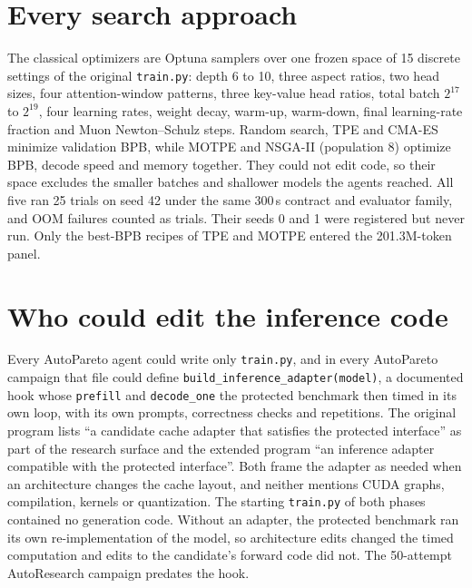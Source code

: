 \documentclass{article}
\begin{document}
\section{Every search approach}\label{app:approaches}
\begin{table}[H]
\caption{Every search approach and what became of its recipes. Attempts: scheduled (completed and trained). Best val BPB: the lowest validation BPB of one archived 300\,s discovery run, per seed for AutoPareto (0 / 1 / 42) and for AutoResearch's 50-attempt campaign / 5-attempt follow-up. These are single noisy runs (pooled seed SD \CRPooledSD), comparable only within one seed and phase: the starting model's score differs by \CRBaseSeedEffect{} BPB between seeds 0 and 42, and the extended harness is another setting. Verified: retrained on new seeds in the seeds 3 to 5 panel (Table~\ref{tab:benchseeds}), E1, the Opus retraining or the 13-recipe test (Table~\ref{tab:verify}), or re-measured on a fresh A40.}\label{tab:approaches}
\centering\scriptsize\setlength{\tabcolsep}{3pt}
\end{table}
The classical optimizers are Optuna samplers over one frozen space of 15 discrete settings of the original \texttt{train.py}: depth 6 to 10, three aspect ratios, two head sizes, four attention-window patterns, three key-value head ratios, total batch $2^{17}$ to $2^{19}$, four learning rates, weight decay, warm-up, warm-down, final learning-rate fraction and Muon Newton--Schulz steps. Random search, TPE and CMA-ES minimize validation BPB, while MOTPE and NSGA-II (population 8) optimize BPB, decode speed and memory together. They could not edit code, so their space excludes the smaller batches and shallower models the agents reached. All five ran 25 trials on seed 42 under the same 300\,s contract and evaluator family, and OOM failures counted as trials. Their seeds 0 and 1 were registered but never run. Only the best-BPB recipes of TPE and MOTPE entered the 201.3M-token panel.

\section{Who could edit the inference code}\label{app:access}
Every AutoPareto agent could write only \texttt{train.py}, and in every AutoPareto campaign that file could define \texttt{build\_inference\_adapter(model)}, a documented hook whose \texttt{prefill} and \texttt{decode\_one} the protected benchmark then timed in its own loop, with its own prompts, correctness checks and repetitions. The original program lists ``a candidate cache adapter that satisfies the protected interface'' as part of the research surface and the extended program ``an inference adapter compatible with the protected interface''. Both frame the adapter as needed when an architecture changes the cache layout, and neither mentions CUDA graphs, compilation, kernels or quantization. The starting \texttt{train.py} of both phases contained no generation code. Without an adapter, the protected benchmark ran its own re-implementation of the model, so architecture edits changed the timed computation and edits to the candidate's forward code did not. The 50-attempt AutoResearch campaign predates the hook.
\end{document}
